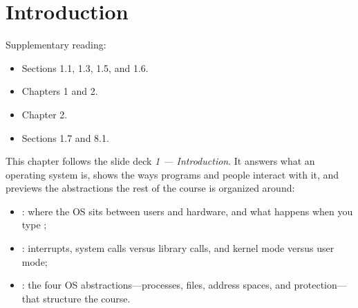 \chapter{Introduction}
\label{ch:intro}

Supplementary reading:
\begin{itemize}
  \item \cite{MOS} Sections 1.1, 1.3, 1.5, and 1.6.
  \item \cite{OSC} Chapters 1 and 2.
  \item \cite{OSTEP} Chapter 2.
  \item \cite{CSAPP} Sections 1.7 and 8.1.
\end{itemize}

This chapter follows the slide deck \emph{1 --- Introduction}. It answers what an operating system is, shows the ways programs and people interact with it, and previews the abstractions the rest of the course is organized around:
\begin{itemize}
  \item {}: where the OS sits between users and hardware, and what happens when you type ;
  \item {}: interrupts, system calls versus library calls, and kernel mode versus user mode;
  \item {}: the four OS abstractions---processes, files, address spaces, and protection---that structure the course.
\end{itemize}




